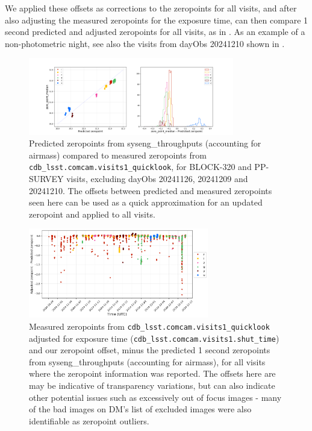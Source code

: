 We applied these offsets as corrections to the zeropoints for all visits, and after also adjusting the measured zeropoints for the exposure time, can  then compare 1 second predicted and adjusted zeropoints for all visits, as in .  As an example of a non-photometric night, see also the visits from dayObs 20241210 shown in . 

\begin{figure}
    \centering
    \includegraphics[width=0.8\textwidth]{sp/zeropoints.png}
    \caption{Predicted zeropoints from syseng\_throughputs (accounting for airmass) compared to measured zeropoints from \texttt{cdb\_lsst.comcam.visits1\_quicklook},  for BLOCK-320 and PP-SURVEY visits, excluding dayObs 20241126, 20241209 and  20241210. The offsets between predicted and measured zeropoints seen here can be used as a quick approximation for an updated zeropoint and applied to all visits.}
    \label{fig:zeropoints}
    \end{figure}

\begin{figure}
    \centering
    \includegraphics[width=0.7\textwidth]{sp/all_zeropoints.png}
    \caption{Measured zeropoints from \texttt{cdb\_lsst.comcam.visits1\_quicklook} adjusted for exposure time (\texttt{cdb\_lsst.comcam.visits1.shut\_time}) and our zeropoint offset, minus the predicted 1 second zeropoints from syseng\_throughputs (accounting for airmass), for all visits where the zeropoint information was reported. The offsets here are may be indicative of transparency variations, but can also indicate other potential issues such as excessively out of focus images - many of the bad images on DM's list of excluded images were also identifiable as zeropoint outliers.}
    \label{fig:all_zeropoints}
    \end{figure}


